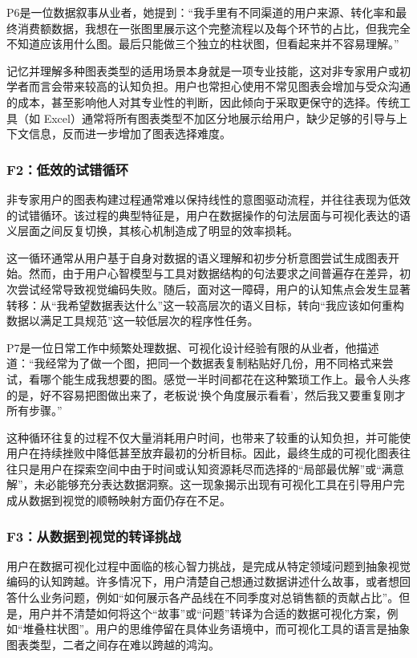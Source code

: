 P6是一位数据叙事从业者，她提到：“我手里有不同渠道的用户来源、转化率和最终消费额数据，我想在一张图里展示这个完整流程以及每个环节的占比，但我完全不知道应该用什么图。最后只能做三个独立的柱状图，但看起来并不容易理解。”

记忆并理解多种图表类型的适用场景本身就是一项专业技能，这对非专家用户或初学者而言会带来较高的认知负担。用户也常担心使用不常见图表会增加与受众沟通的成本，甚至影响他人对其专业性的判断，因此倾向于采取更保守的选择。传统工具（如 Excel）通常将所有图表类型不加区分地展示给用户，缺少足够的引导与上下文信息，反而进一步增加了图表选择难度。

\subsubsection{F2：低效的试错循环}

非专家用户的图表构建过程通常难以保持线性的意图驱动流程，并往往表现为低效的试错循环。该过程的典型特征是，用户在数据操作的句法层面与可视化表达的语义层面之间反复切换，其核心机制造成了明显的效率损耗。

这一循环通常从用户基于自身对数据的语义理解和初步分析意图尝试生成图表开始。然而，由于用户心智模型与工具对数据结构的句法要求之间普遍存在差异，初次尝试经常导致视觉编码失败。随后，面对这一障碍，用户的认知焦点会发生显著转移：从“我希望数据表达什么”这一较高层次的语义目标，转向“我应该如何重构数据以满足工具规范”这一较低层次的程序性任务。

P7是一位日常工作中频繁处理数据、可视化设计经验有限的从业者，他描述道：“我经常为了做一个图，把同一个数据表复制粘贴好几份，用不同格式来尝试，看哪个能生成我想要的图。感觉一半时间都花在这种繁琐工作上。最令人头疼的是，好不容易把图做出来了，老板说‘换个角度展示看看’，然后我又要重复刚才所有步骤。”

这种循环往复的过程不仅大量消耗用户时间，也带来了较重的认知负担，并可能使用户在持续挫败中降低甚至放弃最初的分析目标。因此，最终生成的可视化图表往往只是用户在探索空间中由于时间或认知资源耗尽而选择的“局部最优解”或“满意解”，未必能够充分表达数据洞察。这一现象揭示出现有可视化工具在引导用户完成从数据到视觉的顺畅映射方面仍存在不足。

\subsubsection{F3：从数据到视觉的转译挑战}

用户在数据可视化过程中面临的核心智力挑战，是完成从特定领域问题到抽象视觉编码的认知跨越。许多情况下，用户清楚自己想通过数据讲述什么故事，或者想回答什么业务问题，例如“如何展示各产品线在不同季度对总销售额的贡献占比”。但是，用户并不清楚如何将这个“故事”或“问题”转译为合适的数据可视化方案，例如“堆叠柱状图”。用户的思维停留在具体业务语境中，而可视化工具的语言是抽象图表类型，二者之间存在难以跨越的鸿沟。

